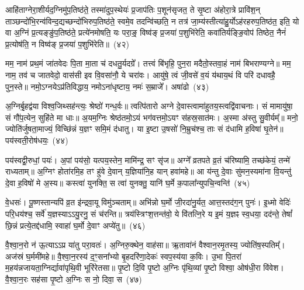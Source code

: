 आहि॑ताग्नेरा॒शीर्यद॒ग्नि\-मु॑प॒तिष्ठ॑ते॒ तस्मा॑दुप॒स्थेयः॑ प्र॒जा\-प॑तिः प॒शून॑सृजत॒ ते सृ॒ष्टा अ॑होरा॒त्रे प्रावि॑श॒न् ताञ्छन्दो॑\-भि॒रन्व॑\-विन्द॒द्यच्छन्दो॑भि\-रुप॒तिष्ठ॑ते॒ स्वमे॒व तदन्वि॑च्छति॒ न तत्र॑ जा॒म्य॑स्तीत्या॑हु॒र्यो\-ऽह॑रहरुप॒तिष्ठ॑त॒ इति॒ यो वा अ॒ग्निं प्र॒त्यङ्ङु॑प॒तिष्ठ॑ते॒ प्रत्ये॑नमोषति॒ यः परा॒ङ्॒ विष्व॑ङ् प्र॒जया॑ प॒शुभि॑रेति॒ कवा॑तिर्यङ्ङि॒वोप॑ तिष्ठेत॒ नैनं॑ प्र॒त्योष॑ति॒ न विष्व॑ङ् प्र॒जया॑ प॒शुभि॑रेति॥~(४२)

{\anuvakamend[{सि॒क्तस्य॑ स॒ह भ॑वति॒ यो यत्खलु॒ वै प॒शुभि॒स्त्रयो॑दश च}]}%

मम॒ नाम॑ प्रथ॒मं जा॑तवेदः पि॒ता मा॒ता च॑ दधतु॒र्यदग्रे᳚। तत्त्वं बि॑भृहि॒ पुन॒रा मदैतो॒स्तवा॒हं नाम॑ बिभराण्यग्ने॥ मम॒ नाम॒ तव॑ च जातवेदो॒ वास॑सी इव वि॒वसा॑नौ॒ ये चरा॑वः। आयु॑षे॒ त्वं जी॒वसे॑ व॒यं य॑थाय॒थं वि परि॑ दधावहै॒ पुन॒स्ते॥ नमो॒\-ऽग्नये\-ऽप्र॑तिविद्धाय॒ नमो\-ऽना॑धृष्टाय॒ नमः॑ स॒म्राजे᳚। अषा॑ढो~(४३)

अ॒ग्निर्बृ॒हद्व॑या विश्व॒जिथ्सह॑न्त्यः॒ श्रेष्ठो॑ गन्ध॒र्वः॥ त्वत्पि॑तारो अग्ने दे॒वास्त्वामा॑\-हुतय॒स्त्वद्वि॑वाचनाः। सं मामायु॑षा॒ सं गौ॑प॒त्येन॒ सुहि॑ते मा धाः॥ अ॒यम॒ग्निः श्रेष्ठ॑तमो॒\-ऽयं भग॑वत्तमो॒\-ऽयꣳ स॑हस्र॒सात॑मः। अ॒स्मा अ॑स्तु सु॒वीर्यम्᳚॥ मनो॒ ज्योति॑र्जुषता॒माज्यं॒ विच्छि॑न्नं य॒ज्ञꣳ समि॒मं द॑धातु। या इ॒ष्टा उ॒षसो॑ नि॒म्रुच॑श्च॒ ताः सं द॑धामि ह॒विषा॑ घृ॒तेन॑॥ पय॑स्वती॒रोष॑धयः॒~(४४)

पय॑स्वद्वी॒रुधां॒ पयः॑। अ॒पां पय॑सो॒ यत्पय॒स्तेन॒ मामि॑न्द्र॒ सꣳ सृ॑ज॥ अग्ने᳚ व्रतपते व्र॒तं च॑रिष्यामि॒ तच्छ॑केयं॒ तन्मे॑ राध्यताम्॥ अ॒ग्निꣳ होता॑रमि॒ह तꣳ हु॑वे दे॒वान् य॒ज्ञिया॑नि॒ह यान् हवा॑महे॥ आ य॑न्तु दे॒वाः सु॑मन॒स्यमा॑ना वि॒यन्तु॑ दे॒वा ह॒विषो॑ मे अ॒स्य॥ कस्त्वा॑ युनक्ति॒ स त्वा॑ युनक्तु॒ यानि॑ घ॒र्मे क॒पाला᳚न्युपचि॒न्वन्ति॑~(४५)

वे॒धसः॑। पू॒ष्णस्तान्यपि॑ व्र॒त इ॑न्द्रवा॒यू विमु॑ञ्चताम्॥ अभि॑न्नो घ॒र्मो जी॒रदा॑नु॒र्यत॒ आत्त॒स्तद॑ग॒न् पुनः॑। इ॒ध्मो वेदिः॑ परि॒धय॑श्च॒ सर्वे॑ य॒ज्ञस्या\-ऽ\-ऽयु॒रनु॒ सं च॑रन्ति॥ त्रय॑स्त्रिꣳश॒त्तन्त॑वो॒ ये वि॑तत्नि॒रे य इ॒मं य॒ज्ञꣴ स्व॒धया॒ दद॑न्ते॒ तेषां᳚ छि॒न्नं प्रत्ये॒तद्द॑धामि॒ स्वाहा॑ घ॒र्मो दे॒वाꣳ अप्ये॑तु॥~(४६)

{}%

वै॒श्वा॒न॒रो न॑ ऊ॒त्या\-ऽ\-ऽप्र या॑तु परा॒वतः॑। अ॒ग्निरु॒क्थेन॒ वाह॑सा॥ ऋ॒तावा॑नं वैश्वान॒रमृ॒तस्य॒ ज्योति॑ष॒स्पतिम्᳚। अज॑स्रं घ॒र्ममी॑महे॥ वै॒श्वा॒न॒रस्य॑ द॒ꣳ॒सना᳚भ्यो बृ॒हदरि॑णा॒देकः॑ स्वप॒स्य॑या क॒विः। उ॒भा पि॒तरा॑ म॒हय॑न्नजायता॒ग्निर्द्यावा॑\-पृथि॒वी भूरि॑रेतसा॥ पृ॒ष्टो दि॒वि पृ॒ष्टो अ॒ग्निः पृ॑थि॒व्यां पृ॒ष्टो विश्वा॒ ओष॑धी॒रा वि॑वेश। वै॒श्वा॒न॒रः सह॑सा पृ॒ष्टो अ॒ग्निः स नो॒ दिवा॒ स~(४७)


